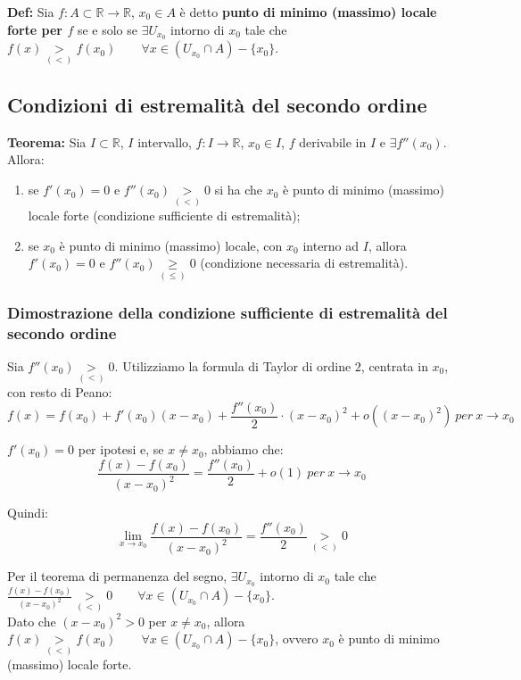 \documentclass{article}
\begin{document}
\noindent\textbf{Def:} Sia $f: A \subset \mathbb{R} \xrightarrow{} \mathbb{R}$, $x_0 \in A$ è detto \textbf{punto di minimo (massimo) locale forte per $f$} se e solo se $\exists U_{x_0}$ intorno di $x_0$ tale che $f(x) \underset{(<)}{>} f(x_0) \qquad \forall x \in (U_{x_0} \cap A) - \{x_0\}$.

\subsection{Condizioni di estremalità del secondo ordine}
\textbf{Teorema: } Sia $I \subset \mathbb{R}$, $I$ intervallo, $f: I \xrightarrow{} \mathbb{R}$, $x_0 \in I$, $f$ derivabile in $I$ e $\exists f''(x_0)$. Allora:
\begin{enumerate}[label=\alph*)]
    \item se $f'(x_0) = 0$ e $f''(x_0) \underset{(<)}{>} 0$ si ha che $x_0$ è punto di minimo (massimo) locale forte (condizione sufficiente di estremalità);
    \item se $x_0$ è punto di minimo (massimo) locale, con $x_0$ interno ad $I$, allora $f'(x_0) = 0$ e $f''(x_0) \underset{(\leq)}{\geq} 0$ (condizione necessaria di estremalità).
\end{enumerate}

\subsubsection{Dimostrazione della condizione sufficiente di estremalità del secondo ordine}
Sia $f''(x_0) \underset{(<)}{>} 0$. Utilizziamo la formula di Taylor di ordine $2$, centrata in $x_0$, con resto di Peano:
\begin{equation*}
    f(x) = f(x_0) + f'(x_0)(x - x_0) + \frac{f''(x_0)}{2} \cdot (x - x_0)^2 + o((x - x_0)^2) \ per \ x \to x_0
\end{equation*}

\noindent $f'(x_0) = 0$ per ipotesi e, se $x \neq x_0$, abbiamo che:
\begin{equation*}
    \frac{f(x) - f(x_0)}{(x - x_0)^2} =  \frac{f''(x_0)}{2} + o(1) \ per \ x \to x_0
\end{equation*}

\noindent Quindi:
\begin{equation*}
    \lim_{x \to x_0} \frac{f(x) - f(x_0)}{(x - x_0)^2} = \frac{f''(x_0)}{2} \underset{(<)}{>} 0
\end{equation*}

\noindent Per il teorema di permanenza del segno, $\exists U_{x_0}$ intorno di $x_0$ tale che $\frac{f(x) - f(x_0)}{(x - x_0)^2} \underset{(<)}{>} 0 \qquad \forall x \in (U_{x_0} \cap A) - \{x_0\}$. \\
Dato che $(x - x_0)^2 > 0$ per $x \neq x_0$, allora $f(x) \underset{(<)}{>} f(x_0) \qquad \forall x \in (U_{x_0} \cap A) - \{x_0\}$, ovvero $x_0$ è punto di minimo (massimo) locale forte.
\end{document}
